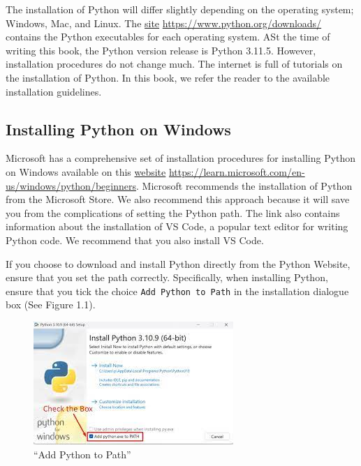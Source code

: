 \documentclass[
  letterpaper,
  DIV=11,
  numbers=noendperiod]{scrreprt}
\begin{document}
The installation of Python will differ slightly depending on the
operating system; Windows, Mac, and Linux. The
\href{https://www.python.org/downloads/}{site}
\url{https://www.python.org/downloads/} contains the Python executables
for each operating system. ASt the time of writing this book, the Python
version release is Python 3.11.5. However, installation procedures do
not change much. The internet is full of tutorials on the installation
of Python. In this book, we refer the reader to the available
installation guidelines.

\hypertarget{installing-python-on-windows}{%
\subsection{Installing Python on
Windows}\label{installing-python-on-windows}}

Microsoft has a comprehensive set of installation procedures for
installing Python on Windows available on this
\href{https://learn.microsoft.com/en-us/windows/python/beginners}{website}
\url{https://learn.microsoft.com/en-us/windows/python/beginners}.
Microsoft recommends the installation of Python from the Microsoft
Store. We also recommend this approach because it will save you from the
complications of setting the Python path. The link also contains
information about the installation of VS Code, a popular text editor for
writing Python code. We recommend that you also install VS Code.

If you choose to download and install Python directly from the Python
Website, ensure that you set the path correctly. Specifically, when
installing Python, ensure that you tick the choice
\texttt{Add\ Python\ to\ Path} in the installation dialogue box (See
Figure 1.1).

\begin{figure}

{\centering \includegraphics{"images/path.jpeg"}

}

\caption{``Add Python to Path''}

\end{figure}
\end{document}
